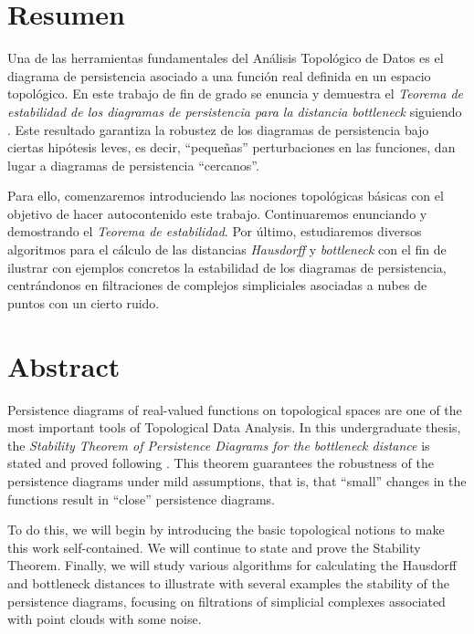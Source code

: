 \chapter*{Resumen}
Una de las herramientas fundamentales del Análisis Topológico de Datos es el diagrama de persistencia asociado a una función real definida en un espacio topológico. En este trabajo de fin de grado se enuncia y demuestra el \emph{Teorema de estabilidad de los diagramas de persistencia para la distancia bottleneck} siguiendo \cite{Cohen-Steiner2007}. Este resultado garantiza la robustez de los diagramas de persistencia bajo ciertas hipótesis leves, es decir, ``pequeñas'' perturbaciones en las funciones, dan lugar a diagramas de persistencia ``cercanos''.  

Para ello, comenzaremos introduciendo las nociones topológicas básicas con el objetivo de hacer autocontenido este trabajo. Continuaremos enunciando y demostrando el \emph{Teorema de estabilidad}. Por último, estudiaremos diversos algoritmos para el cálculo de las distancias \emph{Hausdorff} y \emph{bottleneck} con el fin de ilustrar con ejemplos concretos la estabilidad de los diagramas de persistencia, centrándonos en filtraciones de complejos simpliciales asociadas a nubes de puntos con un cierto ruido.
\newpage

\chapter*{Abstract}
Persistence diagrams of real-valued functions on topological spaces are one of the most important tools of Topological Data Analysis. In this undergraduate thesis, the \emph{Stability Theorem of Persistence Diagrams for the bottleneck distance} is stated and proved following \cite{Cohen-Steiner2007}. This theorem guarantees the robustness of the persistence diagrams under mild assumptions, that is, that ``small'' changes in the functions result in ``close'' persistence diagrams.

To do this, we will begin by introducing the basic topological notions to make this work self-contained. We will continue to state and prove the Stability Theorem. Finally, we will study various algorithms for calculating the Hausdorff and bottleneck distances to illustrate with several examples the stability of the persistence diagrams, focusing on filtrations of simplicial complexes associated with point clouds with some noise.

